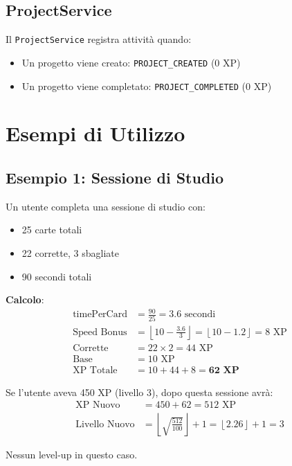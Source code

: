 \documentclass[11pt,a4paper]{article}
\begin{document}
\subsection{ProjectService}

Il \texttt{ProjectService} registra attività quando:
\begin{itemize}
    \item Un progetto viene creato: \texttt{PROJECT\_CREATED} (0 XP)
    \item Un progetto viene completato: \texttt{PROJECT\_COMPLETED} (0 XP)
\end{itemize}

\section{Esempi di Utilizzo}

\subsection{Esempio 1: Sessione di Studio}

Un utente completa una sessione di studio con:
\begin{itemize}
    \item 25 carte totali
    \item 22 corrette, 3 sbagliate
    \item 90 secondi totali
\end{itemize}

\textbf{Calcolo}:
\begin{align}
\text{timePerCard} &= \frac{90}{25} = 3.6 \text{ secondi} \\
\text{Speed Bonus} &= \left\lfloor 10 - \frac{3.6}{3} \right\rfloor = \left\lfloor 10 - 1.2 \right\rfloor = 8 \text{ XP} \\
\text{Corrette} &= 22 \times 2 = 44 \text{ XP} \\
\text{Base} &= 10 \text{ XP} \\
\text{XP Totale} &= 10 + 44 + 8 = \textbf{62 XP}
\end{align}

Se l'utente aveva 450 XP (livello 3), dopo questa sessione avrà:
\begin{align}
\text{XP Nuovo} &= 450 + 62 = 512 \text{ XP} \\
\text{Livello Nuovo} &= \left\lfloor \sqrt{\frac{512}{100}} \right\rfloor + 1 = \left\lfloor 2.26 \right\rfloor + 1 = 3
\end{align}

Nessun level-up in questo caso.
\end{document}
